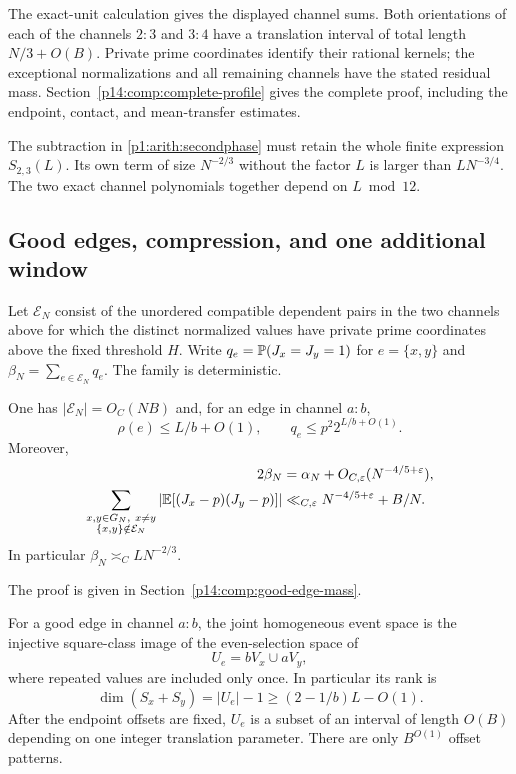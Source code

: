 The exact-unit calculation gives the displayed channel sums. Both
orientations of each of the channels $2:3$ and $3:4$ have a translation
interval of total length $N/3+O(B)$. Private prime coordinates identify
their rational kernels; the exceptional normalizations and all remaining
channels have the stated residual mass. Section~\ref{p14:comp:complete-profile}
gives the complete proof, including the endpoint, contact, and
mean-transfer estimates.

The subtraction in \eqref{p1:arith:secondphase} must retain the whole finite
expression $S_{2,3}(L)$.  Its own term of size $N^{-2/3}$ without the factor
$L$ is larger than $LN^{-3/4}$.  The two exact channel polynomials together
depend on $L\bmod12$.

\subsection{Good edges, compression, and one additional window}

Let $\mathcal E_N$ consist of the unordered compatible dependent pairs in
the two channels above for which the distinct normalized values have private
prime coordinates above the fixed threshold $H$.  Write
$q_e=\P(J_x=J_y=1)$ for $e=\{x,y\}$ and
$\beta_N=\sum_{e\in\mathcal E_N}q_e$.  The family is deterministic.

\begin{corollary}\label{p1:arith:edgefamily}
One has $|\mathcal E_N|=O_C(NB)$ and, for an edge in channel $a:b$,
\[
 \rho(e)\leq L/b+O(1),\qquad q_e\leq p^2 2^{L/b+O(1)}.
\]
Moreover,
\begin{align}
 2\beta_N&=\alpha_N+O_{C,\varepsilon}(N^{-4/5+\varepsilon}),
    \label{p1:arith:edgemass}\\
 \sum_{\substack{x,y\in G_N,\ x\ne y\\\{x,y\}\notin\mathcal E_N}}
   |\E[(J_x-p)(J_y-p)]|
 &\ll_{C,\varepsilon}N^{-4/5+\varepsilon}+B/N.
    \label{p1:arith:badpairs}
\end{align}
In particular $\beta_N\asymp_C LN^{-2/3}$.
\end{corollary}

The proof is given in Section~\ref{p14:comp:good-edge-mass}.

\begin{lemma}\label{p1:arith:compression}
For a good edge in channel $a:b$, the joint homogeneous event space is the
injective square-class image of the even-selection space of
\[
 U_e=bV_x\cup aV_y,
\]
where repeated values are included only once.  In particular its rank is
\begin{equation}\label{p1:arith:compressedrank}
 \dim(S_x+S_y)=|U_e|-1\geq(2-1/b)L-O(1).
\end{equation}
After the endpoint offsets are fixed, $U_e$ is a subset of an interval of
length $O(B)$ depending on one integer translation parameter.  There are
only $B^{O(1)}$ offset patterns.
\end{lemma}

